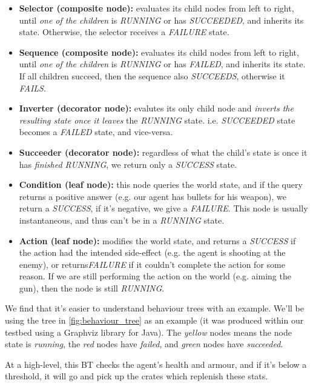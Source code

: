 \documentclass[a4paper, twocolumn]{article}
\begin{document}
        \begin{itemize}
            \item{\textbf{Selector (composite node):} evaluates its child nodes from left to right, until \emph{one of the children} is \emph{RUNNING} or has \emph{SUCCEEDED}, and inherits its state. Otherwise, the selector receives a \emph{FAILURE} state.}
            \item{\textbf{Sequence (composite node):} evaluates its child nodes from left to right, until \emph{one of the children} is \emph{RUNNING} or has \emph{FAILED}, and inherits its state. If all children succeed, then the sequence also \emph{SUCCEEDS}, otherwise it \emph{FAILS}.}
            \item{\textbf{Inverter (decorator node):} evalutes its only child node and \emph{inverts the resulting state once it leaves} the \emph{RUNNING} state. i.e. \emph{SUCCEEDED} state becomes a \emph{FAILED} state, and vice-versa.}
            \item{\textbf{Succeeder (decorator node):} regardless of what the child's state is once it has \emph{finished RUNNING}, we return only a \emph{SUCCESS} state.}
            \item{\textbf{Condition (leaf node):} this node queries the world state, and if the query returns a positive answer (e.g. our agent has bullets for his weapon), we return a \emph{SUCCESS}, if it's negative, we give a \emph{FAILURE}. This node is usually instantaneous, and thus can't be in a \emph{RUNNING} state.}
            \item{\textbf{Action (leaf node):} modifies the world state, and returns a \emph{SUCCESS} if the action had the intended side-effect (e.g. the agent is shooting at the enemy), or returns\emph{FAILURE} if it couldn't complete the action for some reason. If we are still performing the action on the world (e.g. aiming the gun), then the node is still \emph{RUNNING}.}

        \end{itemize}

        We find that it's easier to understand behaviour trees with an example. We'll be using the tree in \cref{fig:behaviour_tree} as an example (it was produced within our testbed using a Graphviz library for Java). The \emph{yellow} nodes means the node state is \emph{running}, the \emph{red} nodes have \emph{failed}, and \emph{green} nodes have \emph{succeeded}.

        At a high-level, this BT checks the agent's health and armour, and if it's below a threshold, it will go and pick up the crates which replenish these stats.
\end{document}
